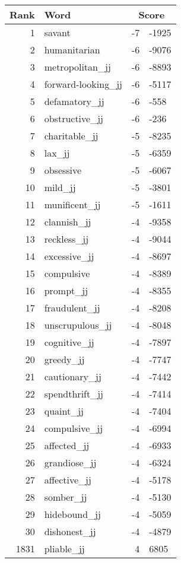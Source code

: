 \begin{longtable}[!htbp]{| rlr@{.}l |}
    \hline
    \textbf{Rank} & \textbf{Word} & \multicolumn{2}{c|}{\textbf{Score}} \\
    \hline
    \endhead
    1 & savant & -7 & -1925 \\
    2 & humanitarian & -6 & -9076 \\
    3 & metropolitan\_jj & -6 & -8893 \\
    4 & forward-looking\_jj & -6 & -5117 \\
    5 & defamatory\_jj & -6 & -558 \\
    6 & obstructive\_jj & -6 & -236 \\
    7 & charitable\_jj & -5 & -8235 \\
    8 & lax\_jj & -5 & -6359 \\
    9 & obsessive & -5 & -6067 \\
    10 & mild\_jj & -5 & -3801 \\
    11 & munificent\_jj & -5 & -1611 \\
    12 & clannish\_jj & -4 & -9358 \\
    13 & reckless\_jj & -4 & -9044 \\
    14 & excessive\_jj & -4 & -8697 \\
    15 & compulsive & -4 & -8389 \\
    16 & prompt\_jj & -4 & -8355 \\
    17 & fraudulent\_jj & -4 & -8208 \\
    18 & unscrupulous\_jj & -4 & -8048 \\
    19 & cognitive\_jj & -4 & -7897 \\
    20 & greedy\_jj & -4 & -7747 \\
    21 & cautionary\_jj & -4 & -7442 \\
    22 & spendthrift\_jj & -4 & -7414 \\
    23 & quaint\_jj & -4 & -7404 \\
    24 & compulsive\_jj & -4 & -6994 \\
    25 & affected\_jj & -4 & -6933 \\
    26 & grandiose\_jj & -4 & -6324 \\
    27 & affective\_jj & -4 & -5178 \\
    28 & somber\_jj & -4 & -5130 \\
    29 & hidebound\_jj & -4 & -5059 \\
    30 & dishonest\_jj & -4 & -4879 \\
    1831 & pliable\_jj & 4 & 6805 \\

\end{longtable}
